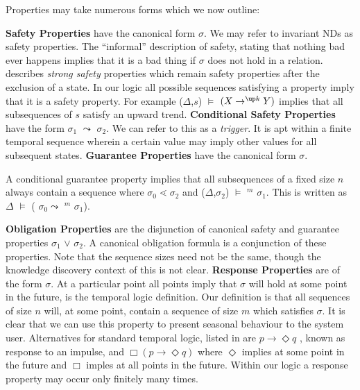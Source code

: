 Properties may take numerous forms which we now outline:

{ \bf Safety Properties} have the canonical form  $\sigma$. We may
refer to invariant NDs as safety properties. The ``informal''
description of safety, stating that nothing bad ever happens implies
that it is a bad thing if $\sigma$ does not hold in a
relation. \cite{sis94} describes {\em strong safety} properties which
remain safety properties after the exclusion of a state. In our logic
all possible sequences satisfying a property imply that it is a safety
property.  For example ($\Delta$,$s$) $\models$  $(X \to^{\up k} Y)$ implies that all
subsequences of $s$ satisfy an upward trend.
{ \bf Conditional Safety Properties} have the form $\sigma_1$ $\leadsto$
 $\sigma_2$. We
can refer to this as a {\em trigger}. It is apt within a finite
temporal sequence wherein a certain value may imply other values for all
subsequent states.
{ \bf Guarantee Properties} have the canonical form  $\sigma$.


\begin{definition}\label{lem:cond_guaran}
\begin{rm}
A conditional guarantee property implies that all subsequences  of
a fixed size $n$ 
always contain a sequence where $\sigma_0 \lessdot \sigma_2$ and
($\Delta$,$\sigma_2$) $\models$ \diam$^{m}$ $\sigma_1$. This is written as
$\Delta$ $\models$  ( $\sigma_0 \leadsto$ \diam$^{m}$ $\sigma_1$).
\end{rm}
\end{definition}

{ \bf Obligation Properties} are the disjunction of canonical safety
and guarantee properties  $\sigma_1$ $\vee$ 
$\sigma_2$. A canonical
obligation formula is a conjunction of these properties. Note that the
sequence sizes need not be the same, though the knowledge discovery
context of this is not clear.
{ \bf Response Properties} are of the form  $\sigma$. At a
particular 
point all points imply that $\sigma$ will hold at some point  in the
future, is the temporal logic definition. Our definition is that 
all sequences of size $n$ will, at some point, contain a sequence of
size $m$ which satisfies $\sigma$. It is clear that we can use this
property to present seasonal behaviour to the system user.
Alternatives for standard temporal logic, listed in \cite{mp92} are $p \to \Diamond q$ ,
known as response to an impulse, and
$\Box(p \to \Diamond q)$ where $\Diamond$ implies at some point in the
future and $\Box$ imples at all points in the future.
Within our logic a response property may occur only finitely
many times.



